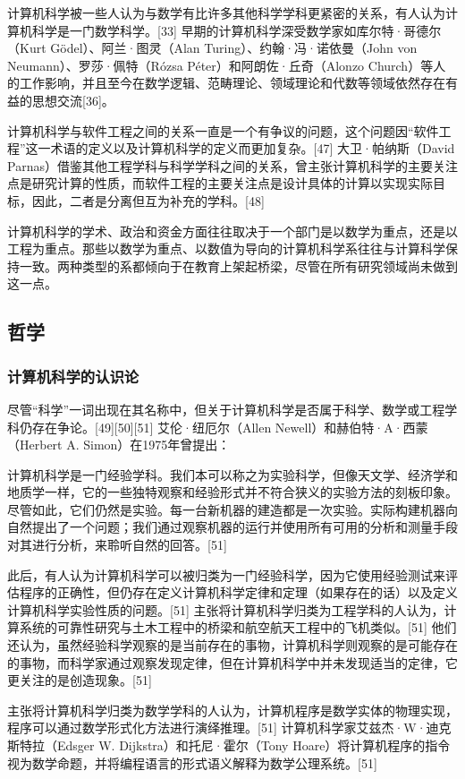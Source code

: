 计算机科学被一些人认为与数学有比许多其他科学学科更紧密的关系，有人认为计算机科学是一门数学科学。[33] 早期的计算机科学深受数学家如库尔特·哥德尔（Kurt Gödel）、阿兰·图灵（Alan Turing）、约翰·冯·诺依曼（John von Neumann）、罗莎·佩特（Rózsa Péter）和阿朗佐·丘奇（Alonzo Church）等人的工作影响，并且至今在数学逻辑、范畴理论、领域理论和代数等领域依然存在有益的思想交流[36]。

计算机科学与软件工程之间的关系一直是一个有争议的问题，这个问题因“软件工程”这一术语的定义以及计算机科学的定义而更加复杂。[47] 大卫·帕纳斯（David Parnas）借鉴其他工程学科与科学学科之间的关系，曾主张计算机科学的主要关注点是研究计算的性质，而软件工程的主要关注点是设计具体的计算以实现实际目标，因此，二者是分离但互为补充的学科。[48]

计算机科学的学术、政治和资金方面往往取决于一个部门是以数学为重点，还是以工程为重点。那些以数学为重点、以数值为导向的计算机科学系往往与计算科学保持一致。两种类型的系都倾向于在教育上架起桥梁，尽管在所有研究领域尚未做到这一点。
\subsection{哲学}  
\subsubsection{计算机科学的认识论}  
尽管“科学”一词出现在其名称中，但关于计算机科学是否属于科学、数学或工程学科仍存在争论。[49][50][51] 艾伦·纽厄尔（Allen Newell）和赫伯特·A·西蒙（Herbert A. Simon）在1975年曾提出：

计算机科学是一门经验学科。我们本可以称之为实验科学，但像天文学、经济学和地质学一样，它的一些独特观察和经验形式并不符合狭义的实验方法的刻板印象。尽管如此，它们仍然是实验。每一台新机器的建造都是一次实验。实际构建机器向自然提出了一个问题；我们通过观察机器的运行并使用所有可用的分析和测量手段对其进行分析，来聆听自然的回答。[51]

此后，有人认为计算机科学可以被归类为一门经验科学，因为它使用经验测试来评估程序的正确性，但仍存在定义计算机科学定律和定理（如果存在的话）以及定义计算机科学实验性质的问题。[51] 主张将计算机科学归类为工程学科的人认为，计算系统的可靠性研究与土木工程中的桥梁和航空航天工程中的飞机类似。[51] 他们还认为，虽然经验科学观察的是当前存在的事物，计算机科学则观察的是可能存在的事物，而科学家通过观察发现定律，但在计算机科学中并未发现适当的定律，它更关注的是创造现象。[51]

主张将计算机科学归类为数学学科的人认为，计算机程序是数学实体的物理实现，程序可以通过数学形式化方法进行演绎推理。[51] 计算机科学家艾兹杰·W·迪克斯特拉（Edsger W. Dijkstra）和托尼·霍尔（Tony Hoare）将计算机程序的指令视为数学命题，并将编程语言的形式语义解释为数学公理系统。[51]
